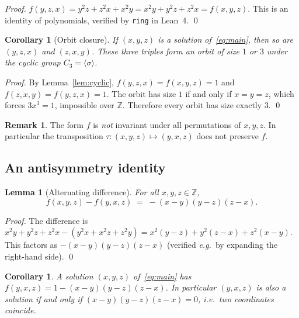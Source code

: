 \documentclass[12pt,a4paper]{article}
\newtheorem{lemma}[theorem]{Lemma}
\newtheorem{corollary}[theorem]{Corollary}
\theoremstyle{definition}
\newtheorem{remark}[theorem]{Remark}
\newcommand{\Z}{\mathbb{Z}}
\begin{document}
\begin{proof}
  $f(y,z,x) = y^2z + z^2x + x^2y = x^2y + y^2z + z^2x = f(x,y,z)$.
  This is an identity of polynomials, verified by \texttt{ring} in
  Lean~4. \qed
\end{proof}

\begin{corollary}[Orbit closure]\label{cor:orbit_closed}
  If $(x,y,z)$ is a solution of~\eqref{eq:main}, then so are
  $(y,z,x)$ and $(z,x,y)$.  These three triples form an orbit of
  size $1$ or $3$ under the cyclic group $C_3 = \langle\sigma\rangle$.
\end{corollary}

\begin{proof}
  By Lemma~\ref{lem:cyclic}, $f(y,z,x) = f(x,y,z) = 1$ and
  $f(z,x,y) = f(y,z,x) = 1$.  The orbit has size $1$ if and only if
  $x=y=z$, which forces $3x^3 = 1$, impossible over $\Z$.
  Therefore every orbit has size exactly $3$. \qed
\end{proof}

\begin{remark}
  The form $f$ is \emph{not} invariant under all permutations of
  $x,y,z$.  In particular the transposition $\tau: (x,y,z)\mapsto(y,x,z)$
  does not preserve $f$.
\end{remark}

\subsection{An antisymmetry identity}

\begin{lemma}[Alternating difference]\label{lem:alt}
  For all $x,y,z\in\Z$,
  \begin{equation}\label{eq:alt}
    f(x,y,z) - f(y,x,z)
    \;=\; -(x-y)(y-z)(z-x).
  \end{equation}
\end{lemma}

\begin{proof}
  The difference is $x^2y + y^2z + z^2x - (y^2x + x^2z + z^2y)
  = x^2(y-z) + y^2(z-x) + z^2(x-y)$.
  This factors as $-(x-y)(y-z)(z-x)$ (verified \emph{e.g.}\ by expanding
  the right-hand side).  \qed
\end{proof}

\begin{corollary}
  A solution $(x,y,z)$ of~\eqref{eq:main} has
  $f(y,x,z) = 1 - (x-y)(y-z)(z-x)$.
  In particular $(y,x,z)$ is also a solution if and only if
  $(x-y)(y-z)(z-x) = 0$, \emph{i.e.}\ two coordinates coincide.
\end{corollary}
\end{document}
